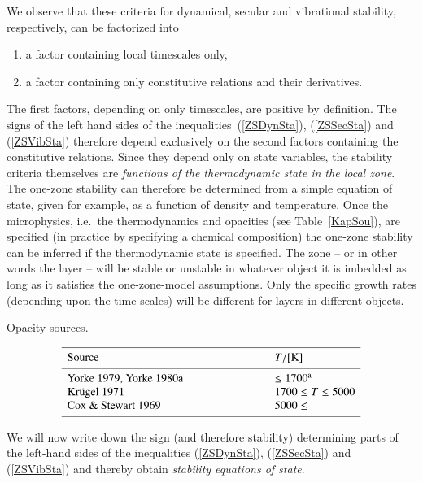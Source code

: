 \documentclass{aa}
\begin{document}
   We observe that these criteria for dynamical, secular and
   vibrational stability, respectively, can be factorized into
   \begin{enumerate}
      \item a factor containing local timescales only,
      \item a factor containing only constitutive relations and
         their derivatives.
   \end{enumerate}
   The first factors, depending on only timescales, are positive
   by definition. The signs of the left hand sides of the
   inequalities~(\ref{ZSDynSta}), (\ref{ZSSecSta}) and (\ref{ZSVibSta})
   therefore depend exclusively on the second factors containing
   the constitutive relations. Since they depend only
   on state variables, the stability criteria themselves are \emph{
   functions of the thermodynamic state in the local zone}. The
   one-zone stability can therefore be determined
   from a simple equation of state, given for example, as a function
   of density and
   temperature. Once the microphysics, i.e.\ the thermodynamics
   and opacities (see Table~\ref{KapSou}), are specified (in practice
   by specifying a chemical composition) the one-zone stability can
   be inferred if the thermodynamic state is specified.
   The zone -- or in
   other words the layer -- will be stable or unstable in
   whatever object it is imbedded as long as it satisfies the
   one-zone-model assumptions. Only the specific growth rates
   (depending upon the time scales) will be different for layers
   in different objects.

   \begin{table}
      \caption[]{Opacity sources.}
         \label{KapSou}
     $$ 
         \begin{array}{p{0.5\linewidth}l}
            \hline
            \noalign{\smallskip}
            Source      &  T / {[\mathrm{K}]} \\
            \noalign{\smallskip}
            \hline
            \noalign{\smallskip}
            Yorke 1979, Yorke 1980a & \leq 1700^{\mathrm{a}}     \\
            Kr\"ugel 1971           & 1700 \leq T \leq 5000 \\
            Cox \& Stewart 1969     & 5000 \leq             \\
            \noalign{\smallskip}
            \hline
         \end{array}
     $$ 
   \end{table}
%
   We will now write down the sign (and therefore stability)
   determining parts of the left-hand sides of the inequalities
   (\ref{ZSDynSta}), (\ref{ZSSecSta}) and (\ref{ZSVibSta}) and thereby
   obtain \emph{stability equations of state}.
\end{document}
